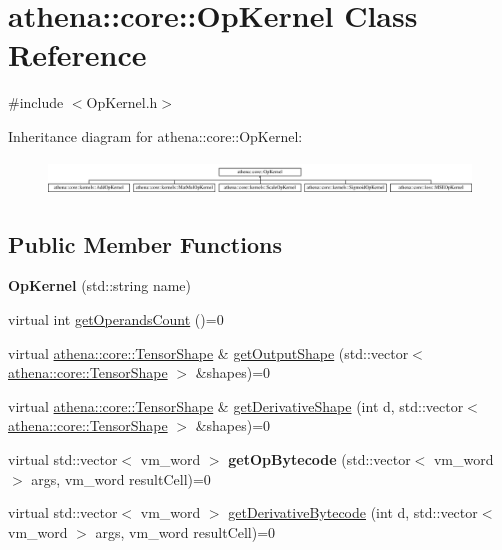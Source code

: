\hypertarget{classathena_1_1core_1_1_op_kernel}{}\section{athena\+:\+:core\+:\+:Op\+Kernel Class Reference}
\label{classathena_1_1core_1_1_op_kernel}


{\ttfamily \#include $<$Op\+Kernel.\+h$>$}

Inheritance diagram for athena\+:\+:core\+:\+:Op\+Kernel\+:\begin{figure}[H]
\begin{center}
\leavevmode
\includegraphics[height=0.929461cm]{d3/d9b/classathena_1_1core_1_1_op_kernel}
\end{center}
\end{figure}
\subsection*{Public Member Functions}
\begin{DoxyCompactItemize}
\item 
\mbox{\label{classathena_1_1core_1_1_op_kernel_a582c69ebeddafd379e264854230d1cb6}} 
{\bfseries Op\+Kernel} (std\+::string name)
\item 
virtual int \mbox{\hyperlink{classathena_1_1core_1_1_op_kernel_add97d4c132d80ecd9915acfedf7c9119}{get\+Operands\+Count}} ()=0
\item 
virtual \mbox{\hyperlink{classathena_1_1core_1_1_tensor_shape}{athena\+::core\+::\+Tensor\+Shape}} \& \mbox{\hyperlink{classathena_1_1core_1_1_op_kernel_a762e541463ffd089b47a8e6755c30fe1}{get\+Output\+Shape}} (std\+::vector$<$ \mbox{\hyperlink{classathena_1_1core_1_1_tensor_shape}{athena\+::core\+::\+Tensor\+Shape}} $>$ \&shapes)=0
\item 
virtual \mbox{\hyperlink{classathena_1_1core_1_1_tensor_shape}{athena\+::core\+::\+Tensor\+Shape}} \& \mbox{\hyperlink{classathena_1_1core_1_1_op_kernel_ad95af6dd184ce7ee9182ec7ca54b6c4d}{get\+Derivative\+Shape}} (int d, std\+::vector$<$ \mbox{\hyperlink{classathena_1_1core_1_1_tensor_shape}{athena\+::core\+::\+Tensor\+Shape}} $>$ \&shapes)=0
\item 
\mbox{\label{classathena_1_1core_1_1_op_kernel_a181a03e0a038151fda074a8c950f3003}} 
virtual std\+::vector$<$ vm\+\_\+word $>$ {\bfseries get\+Op\+Bytecode} (std\+::vector$<$ vm\+\_\+word $>$ args, vm\+\_\+word result\+Cell)=0
\item 
virtual std\+::vector$<$ vm\+\_\+word $>$ \mbox{\hyperlink{classathena_1_1core_1_1_op_kernel_ad500db1afc5a7c10acff8ecb8f1bee4d}{get\+Derivative\+Bytecode}} (int d, std\+::vector$<$ vm\+\_\+word $>$ args, vm\+\_\+word result\+Cell)=0
\end{DoxyCompactItemize}
